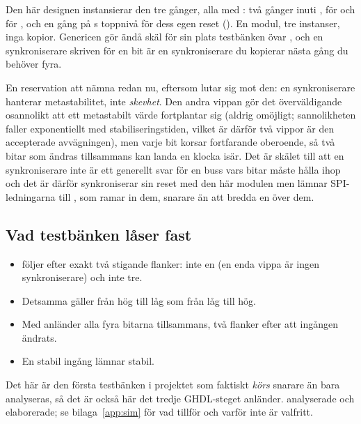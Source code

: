 Den här designen instansierar den tre gånger, alla med : två gånger inuti
, för  och för , och en gång på s
toppnivå för dess egen reset (). En modul, tre instanser, inga kopior. Genericen gör
ändå skäl för sin plats \textemdash{} testbänken övar , och en synkroniserare skriven
för en bit är en synkroniserare du kopierar nästa gång du behöver fyra.

\begin{warning}
En reservation att nämna redan nu, eftersom  lutar sig mot den: en synkroniserare
hanterar metastabilitet, inte \emph{skevhet}. Den andra vippan gör det överväldigande osannolikt att
ett metastabilt värde fortplantar sig (aldrig omöjligt; sannolikheten faller exponentiellt med
stabiliseringstiden, vilket är därför två vippor är den accepterade avvägningen), men varje bit
korsar fortfarande oberoende, så två bitar som ändras tillsammans kan landa en klocka isär. Det är
skälet till att en synkroniserare inte är ett generellt svar för en buss vars bitar måste hålla ihop
\textemdash{} och det är därför  synkroniserar sin reset med den här modulen men
lämnar SPI-ledningarna till , som ramar in dem, snarare än att bredda en
 över dem.
\end{warning}

\subsection{Vad testbänken låser fast}
\label{c12:sub:mptb}

\begin{itemize}
  \item {} följer  efter exakt två stigande flanker: inte en (en enda
    vippa är ingen synkroniserare) och inte tre.
  \item Detsamma gäller från hög till låg som från låg till hög.
  \item Med  anländer alla fyra bitarna tillsammans, två flanker efter att ingången
    ändrats.
  \item En stabil ingång lämnar  stabil.
\end{itemize}

Det här är den första testbänken i projektet som faktiskt \emph{körs} snarare än bara analyseras, så
det är också här det tredje GHDL-steget anländer.  analyserade och elaborerade; se
bilaga~\ref{app:sim} för vad  tillför och varför  inte är
valfritt.

